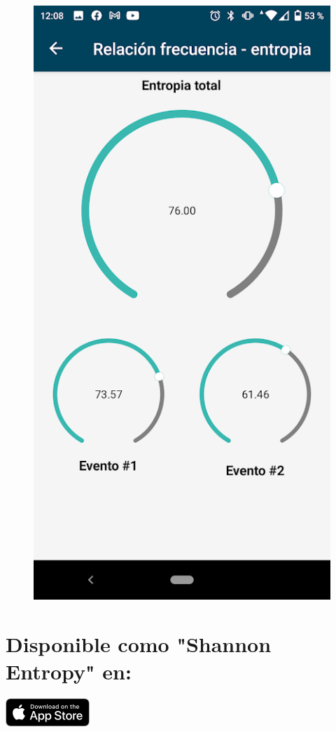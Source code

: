 \documentclass[conference]{IEEEtran}
\begin{document}
\begin{enumerate}
\begin{figure}[h!]
        \includegraphics[scale=0.4]{captura6.png}
    \end{figure}
\end{enumerate}

\section{Disponible como "Shannon Entropy" en:}



\begin{center}
    \href{https://apps.apple.com/mx/app/shannon-entropy/id1566482675}
    {
        \includegraphics{apple-app-store-badge.png}
    } 
\end{center}
\end{document}
